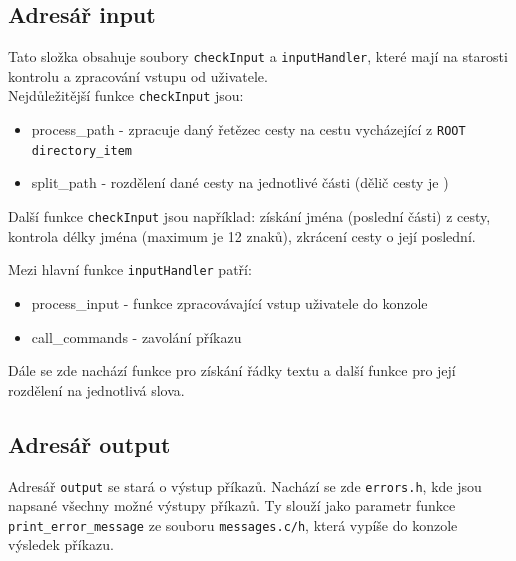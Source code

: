 \documentclass[12pt]{report}
\begin{document}
	\subsection*{Adresář input}
	Tato složka obsahuje soubory \texttt{checkInput} a \texttt{inputHandler}, které mají na starosti kontrolu a zpracování vstupu od uživatele.\\
	Nejdůležitější funkce \texttt{checkInput} jsou:
	\begin{itemize}
		\item process\_path - zpracuje daný řetězec cesty na cestu vycházející z \texttt{ROOT} \texttt{directory\_item}
		\item split\_path - rozdělení dané cesty na jednotlivé části (dělič cesty je \uv{/})
	\end{itemize}
	Další funkce \texttt{checkInput} jsou například: získání jména (poslední části) z cesty, kontrola délky jména (maximum je 12 znaků), zkrácení cesty o její poslední.
	
	Mezi hlavní funkce \texttt{inputHandler} patří:
	\begin{itemize}
		\item process\_input - funkce zpracovávající vstup uživatele do konzole
		\item call\_commands - zavolání příkazu
	\end{itemize}
	Dále se zde nachází funkce pro získání řádky textu a další funkce pro její rozdělení na jednotlivá slova.
	
	\subsection*{Adresář output}
	Adresář \texttt{output} se stará o výstup příkazů. Nachází se zde \texttt{errors.h}, kde jsou napsané všechny možné výstupy příkazů. Ty slouží jako parametr funkce \texttt{print\_error\_message} ze souboru \texttt{messages.c/h}, která vypíše do konzole výsledek příkazu.
\end{document}
